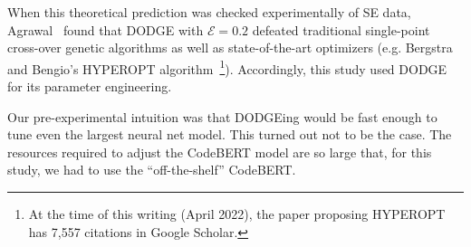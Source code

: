 When this theoretical prediction was checked
experimentally of SE data, Agrawal~\cite{agrawal2021simpler}  found that DODGE with 
$\mathcal{E}=0.2$ defeated traditional single-point cross-over genetic algorithms as well as state-of-the-art optimizers
(e.g. Bergstra and Bengio's HYPEROPT algorithm~\cite{Bergstra12}\footnote{At the time of this writing (April 2022), the paper proposing HYPEROPT has 7,557 citations in
Google Scholar.}).  Accordingly, this study used DODGE for its parameter engineering.




Our pre-experimental intuition was that DODGEing would
be fast enough to tune even the largest neural net model. This turned out not to be the case. The resources required
to adjust the CodeBERT model are so large that, for this
study, we had to use the ``off-the-shelf'' CodeBERT.









